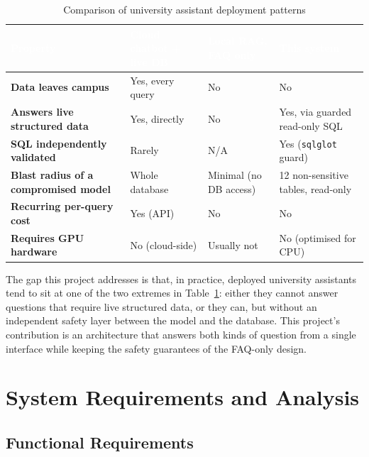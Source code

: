 \documentclass[11pt,a4paper,oneside]{report}
\begin{document}
\begin{table}[h]
\centering
\caption{Comparison of university assistant deployment patterns}
\label{tab:comparison}
\renewcommand{\arraystretch}{1.3}
\begin{tabularx}{\linewidth}{|>{\bfseries}p{3.1cm}|X|X|X|}
\hline
\rowcolor{hdrnavy}
\textcolor{white}{Property} & \textcolor{white}{Cloud chatbot + live DB} &
\textcolor{white}{Local RAG, FAQ only} & \textcolor{white}{This system} \\
\hline
Data leaves campus & Yes, every query & No & No \\
\hline
Answers live structured data & Yes, directly & No & Yes, via guarded read-only SQL \\
\hline
SQL independently validated & Rarely & N/A & Yes (\texttt{sqlglot} guard) \\
\hline
Blast radius of a compromised model & Whole database & Minimal (no DB access) & 12 non-sensitive tables, read-only \\
\hline
Recurring per-query cost & Yes (API) & No & No \\
\hline
Requires GPU hardware & No (cloud-side) & Usually not & No (optimised for CPU) \\
\hline
\end{tabularx}
\end{table}

The gap this project addresses is that, in practice, deployed university
assistants tend to sit at one of the two extremes in Table~\ref{tab:comparison}:
either they cannot answer questions that require live structured data, or
they can, but without an independent safety layer between the model and the
database. This project's contribution is an architecture that answers both
kinds of question from a single interface while keeping the safety guarantees
of the FAQ-only design.

\chapter{System Requirements and Analysis}

\section{Functional Requirements}
\end{document}
